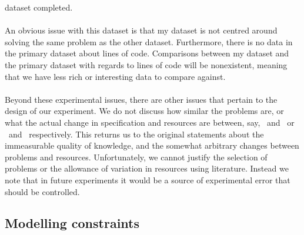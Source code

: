 dataset completed.\\
\\
An obvious issue with this dataset is that my dataset is not centred around
solving the same problem as the other dataset.
Furthermore, there is no data in the primary dataset about lines of code.
Comparisons between my dataset and the primary dataset with regards to lines of
code will be nonexistent, meaning that we have less rich or interesting data to
compare against.\\
\\
Beyond these experimental issues, there are other issues that pertain to
the design of our experiment.
We do not discuss how similar the problems are, or what the actual change in
specification and resources are between, say, \PO\ and \PT\ or \LA\ and \LB\ 
respectively.
This returns us to the original statements about the immeasurable quality of
knowledge, and the somewhat arbitrary changes between problems and resources.
Unfortunately, we cannot justify the selection of problems or the allowance of
variation in resources using literature.
Instead we note that in future experiments it would be a source of experimental
error that should be controlled.

\subsection{Modelling constraints} \label{subsecModelling}

